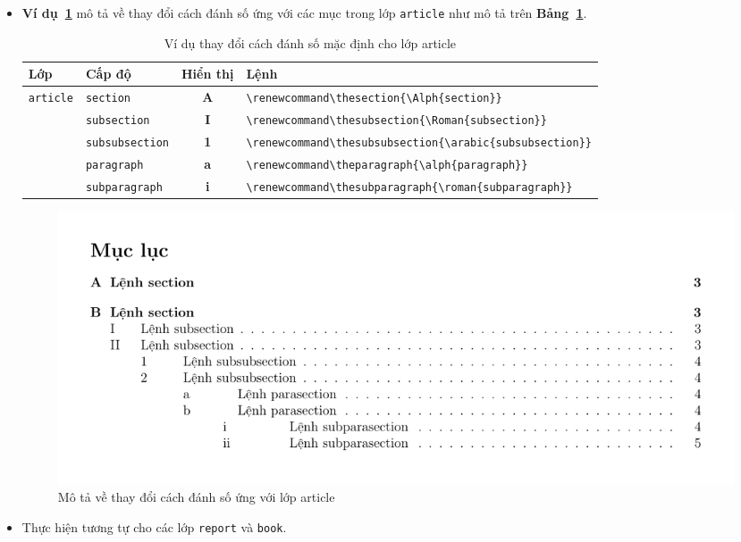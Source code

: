 \documentclass[12pt,a4paper]{article}
\newcommand{\tab}[1]{\textbf{Bảng~#1}}
\newcommand{\ex}[1]{\textbf{Ví dụ~#1}}
\newcommand{\head}[1]{\textbf{#1}}
\newcommand{\command}[1]{\texttt{\string#1}}
\begin{document}
\begin{itemize}
		\item \ex{\ref{Ex:thaydoi-label-article}} mô tả về thay đổi cách đánh số ứng với các mục trong lớp \Verb|article| như mô tả trên \tab{\ref{Tab:label-cautruc}}.				
		
		\begin{table}[h]
				\begin{center}
					\begin{footnotesize}
						\begin{tabular}{llcl}\toprule
							\head{Lớp} & \head{Cấp độ} & \head{Hiển thị} & \head{Lệnh}  \\ \midrule
							\multirow{7}{*}{\command{article}} & \Verb|section| & \textbf{A} & \Verb|\renewcommand\thesection{\Alph{section}}|  \\ \cmidrule{2-4}
							& \Verb|subsection| & \textbf{I} & \Verb|\renewcommand\thesubsection{\Roman{subsection}}| \\ \cmidrule{2-4}
							& \Verb|subsubsection| & \textbf{1} & \Verb|\renewcommand\thesubsubsection{\arabic{subsubsection}}| \\ \cmidrule{2-4}
							& \Verb|paragraph| & \textbf{a} & \Verb|\renewcommand\theparagraph{\alph{paragraph}}| \\ \cmidrule{2-4}
							& \Verb|subparagraph| & \textbf{i} & \Verb|\renewcommand\thesubparagraph{\roman{subparagraph}}| \\ \bottomrule
						\end{tabular}
					\end{footnotesize}
				\end{center}
				\caption{Ví dụ thay đổi cách đánh số mặc định cho lớp article} \label{Tab:label-cautruc}
			\end{table}
			
			\begin{figure}
				\begin{center}
					\includegraphics[scale=.75]{section-subparagraph-article-5}
				\end{center}
				\caption{Mô tả về thay đổi cách đánh số ứng với lớp article} \label{Ex:thaydoi-label-article}
			\end{figure}
\newpage			
		\item Thực hiện tương tự cho các lớp \Verb|report| và \Verb|book|.
	\end{itemize}
\end{document}
